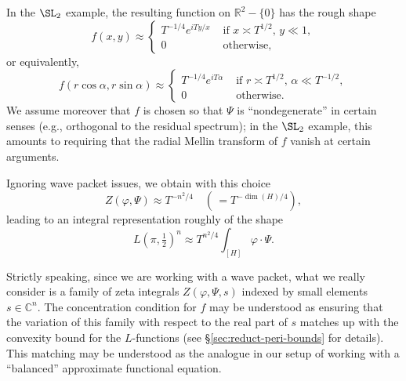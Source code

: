 In the $\SL_2$ example, the resulting function on $\mathbb{R}^2 - \{0\}$ has the rough shape
\begin{equation*}
  f(x,y) \approx
  \begin{cases}
    T^{-1/4}
    e^{i T y/x}
    & \text{ if }
      x \asymp T^{1/2}, \, y \ll 1, \\
    0 & \text{ otherwise,}
  \end{cases}
\end{equation*}
or equivalently,
\begin{equation*}
  f(r \cos \alpha, r \sin \alpha) \approx
  \begin{cases}
    T^{-1/4}  e^{i T \alpha}
    & \text{ if } r \asymp T^{1/2}, \,  \alpha \ll T^{-1/2}, \\
    0 & \text{ otherwise.}
  \end{cases}
\end{equation*}
We assume moreover that $f$ is chosen so that $\Psi$ is ``nondegenerate'' in certain senses (e.g., orthogonal to the residual spectrum); in the $\SL_2$ example, this amounts to requiring that the radial Mellin transform of $f$ vanish at certain arguments.


Ignoring wave packet issues, we obtain with this choice
\begin{equation}\label{eq:zvarphi-psi-approx}
  Z(\varphi, \Psi) \approx T^{-n^2/4} \quad
  \left( \, = T^{- \dim(H) / 4} \right),
\end{equation}
leading to an integral representation roughly of the shape
\begin{equation*}
  L(\pi,\tfrac{1}{2})^{n}  \approx T^{n^2/4} \int_{[H]} \varphi \cdot \Psi.
\end{equation*}
\begin{remark}
  Strictly speaking, since we are working with a wave packet, what we really consider is a family of zeta integrals $Z(\varphi, \Psi, s)$ indexed by small elements $s \in \mathbb{C}^n$.  The concentration condition for $f$ may be understood as ensuring that the variation of this family with respect to the real part of $s$ matches up with the convexity bound for the $L$-functions (see \S\ref{sec:reduct-peri-bounds} for details).  This matching may be understood as the analogue in our setup of working with a ``balanced'' approximate functional equation.
\end{remark}

